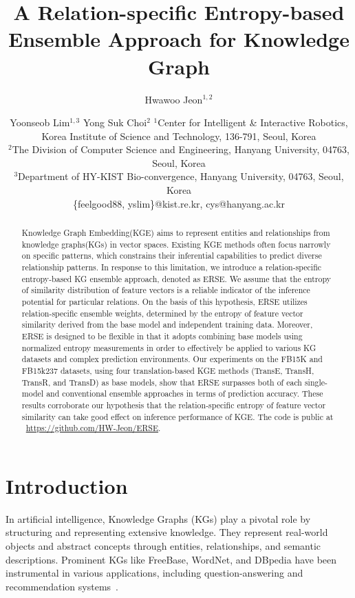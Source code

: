 \documentclass{article}
\title{A Relation-specific Entropy-based Ensemble Approach for Knowledge Graph}
\author{
Hwawoo Jeon$^{1,2}$\and
Yoonseob Lim$^{1,3}$\And
Yong Suk Choi$^2$
\affiliations
$^1$Center for Intelligent \& Interactive Robotics\unskip,
Korea Institute of Science and Technology\unskip, 136-791\unskip, Seoul\unskip, Korea\\
$^2$The Division of Computer Science and Engineering\unskip,
Hanyang University\unskip, 04763\unskip, Seoul\unskip, Korea\\
$^3$Department of HY-KIST Bio-convergence\unskip,
Hanyang University\unskip, 04763\unskip, Seoul\unskip, Korea\\
\emails
\{feelgood88, yslim\}@kist.re.kr,
cys@hanyang.ac.kr
}
\begin{document}
\maketitle

\begin{abstract}
    Knowledge Graph Embedding(KGE) aims to represent entities and relationships from knowledge graphs(KGs) in vector spaces. Existing KGE methods often focus narrowly on specific patterns, which constrains their inferential capabilities to predict diverse relationship patterns. In response to this limitation, we introduce a relation-specific entropy-based KG ensemble approach, denoted as ERSE. We assume that the entropy of similarity distribution of feature vectors is a reliable indicator of the inference potential for particular relations. On the basis of this hypothesis, ERSE utilizes relation-specific ensemble weights, determined by the entropy of feature vector similarity derived from the base model and independent training data. Moreover, ERSE is designed to be flexible in that it adopts combining base models using normalized entropy measurements in order to effectively be applied to various KG datasets and complex prediction environments. Our experiments on the FB15K and FB15k237 datasets, using four translation-based KGE methods (TransE, TransH, TransR, and TransD) as base models, show that ERSE surpasses both of each single-model and conventional ensemble approaches in terms of prediction accuracy. These results corroborate our hypothesis that the relation-specific entropy of feature vector similarity can take good effect on inference performance of KGE. The code is public at ~\hyperlink{https://github.com/HW-Jeon/ERSE}{https://github.com/HW-Jeon/ERSE}.

\end{abstract}

\section{Introduction}

In artificial intelligence, Knowledge Graphs (KGs) play a pivotal role by structuring and representing extensive knowledge. They represent real-world objects and abstract concepts through entities, relationships, and semantic descriptions. Prominent KGs like FreeBase, WordNet, and DBpedia have been instrumental in various applications, including question-answering and recommendation systems~\cite{10.1093/bib/bbac481,zheng2021knowledge,chen2021topic}.
\end{document}
